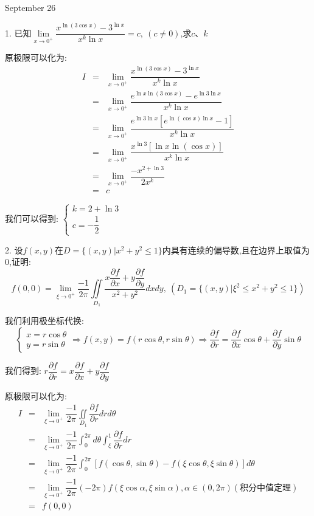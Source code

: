 \textcolor{purplea}{September 26}

1. 已知$\lim\limits_{x\to 0^{+}}\dfrac{x^{\ln (3\cos x)}-3^{\ln x}}{x^k\ln x}=c,\ (c\neq 0)$,求$c$、$k$
\begin{solution}

	原极限可以化为:  
	\begin{eqnarray*}
		I&=&\lim\limits_{x\to 0^{+}}\dfrac{x^{\ln (3\cos x)}-3^{\ln x}}{x^k\ln x}\\
		&=&\lim\limits_{x\to 0^{+}}\dfrac{e^{\ln x\ln (3\cos x)}-e^{\ln3\ln x}}{x^k\ln x}\\
		&=&\lim\limits_{x\to 0^{+}}\dfrac{e^{\ln3\ln x}[e^{\ln(\cos x)\ln x}-1]}{x^k\ln x}\\
		&=&\lim\limits_{x\to 0^{+}}\dfrac{x^{\ln3}[\ln x\ln(\cos x)]}{x^k\ln x}\\
		&=&\lim\limits_{x\to 0^{+}}\dfrac{-x^{2+\ln3}}{2x^k}\\
		&=&c
	\end{eqnarray*}
	
	我们可以得到:  $\left\lbrace
	\begin{array}{l}
		k=2+\ln3\\
		c=-\dfrac{1}{2}
	\end{array}
	\right. $
\end{solution}

2. 设$f(x,y)$在$D=\{(x,y)|x^2+y^2\leq 1\}$内具有连续的偏导数,且在边界上取值为$0$,证明:  
$$f(0,0)=\lim\limits_{\xi\to 0^{+}}\dfrac{-1}{2\pi}\iint\limits_{D_{1}}\dfrac{x\dfrac{\partial f}{\partial x}+y\dfrac{\partial f}{\partial y}}{x^2+y^2}dxdy,\ (D_{1}=\{(x,y)|\xi^{2}\leq x^2+y^2\leq 1\})$$
\begin{solution}

	我们利用极坐标代换:  
	$$\left\lbrace
	\begin{array}{l}
		x=r\cos\theta\\
		y=r\sin\theta
	\end{array}
	\right. \Rightarrow f(x,y)=f(r\cos\theta,r\sin\theta)\Rightarrow \dfrac{\partial f}{\partial r}=\dfrac{\partial f}{\partial x}\cos\theta+\dfrac{\partial f}{\partial y}\sin\theta$$
	
	我们得到:  $r\dfrac{\partial f}{\partial r}=x\dfrac{\partial f}{\partial x}+y\dfrac{\partial f}{\partial y}$
	
	原极限可以化为:  
	\begin{eqnarray*}
		I&=&\lim\limits_{\xi\to 0^{+}}\dfrac{-1}{2\pi}\iint\limits_{D_{1}}\dfrac{\partial f}{\partial r}drd\theta\\
		&=&\lim\limits_{\xi\to 0^{+}}\dfrac{-1}{2\pi}\int_{0}^{2\pi}d\theta\int_{\xi}^{1}\dfrac{\partial f}{\partial r}dr\\
		&=&\lim\limits_{\xi\to 0^{+}}\dfrac{-1}{2\pi}\int_{0}^{2\pi}[f(\cos\theta,\sin\theta)-f(\xi\cos\theta,\xi\sin\theta)]d\theta\\
		&=&\lim\limits_{\xi\to 0^{+}}\dfrac{-1}{2\pi}(-2\pi)f(\xi\cos\alpha,\xi\sin\alpha),\alpha\in(0,2\pi)(\text{积分中值定理})\\
		&=&f(0,0)
	\end{eqnarray*}
\end{solution}

